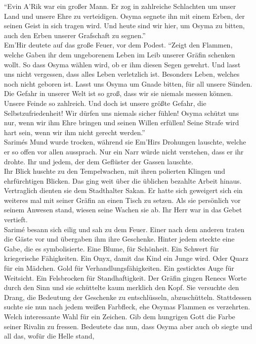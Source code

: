 ``Evin A'Rik war ein großer Mann. Er zog in zahlreiche Schlachten um unser Land und unsere Ehre 
zu verteidigen. Osyma segnete ihn mit einem Erben, der seinen Geist in sich tragen wird. Und heute 
sind wir hier, um Osyma zu bitten, auch den Erben unserer Grafschaft zu segnen.''\\
Em'Hir deutete auf das große Feuer, vor dem Podest. ``Zeigt den Flammen, welche Gaben ihr dem 
ungeborenem Leben im Leib unserer Gräfin schenken wollt. So dass Osyma wählen wird, ob er ihm 
diesen Segen gewehrt. Und lasst uns nicht vergessen, dass alles Leben verletzlich ist. Besonders 
Leben, welches noch nicht geboren ist. Lasst uns Osyma um Gnade bitten, für all unsere Sünden. 
Die Gefahr in unserer Welt ist so groß, dass wir sie niemals messen können. Unsere Feinde so 
zahlreich. Und doch ist unsere größte Gefahr, die Selbstzufriedenheit! Wir dürfen uns niemals 
sicher fühlen! Osyma schützt uns nur, wenn wir ihm Ehre bringen und seinen Willen erfüllen! 
Seine Strafe wird hart sein, wenn wir ihm nicht gerecht werden.''\\
Sarimés Mund wurde trocken, während sie Em'Hirs Drohungen lauschte, welche er so offen vor allen 
aussprach. Nur ein Narr würde nicht verstehen, dass er ihr drohte. Ihr und jedem, der dem 
Geflüster der Gassen lauschte. \\
Ihr Blick huschte zu den Tempelwachen, mit ihren polierten Klingen und ehrfürchtigen Blicken. Das 
ging weit über die üblichen bezahlte Arbeit hinaus. Vertraglich dienten sie dem Stadthalter 
Sakan. Er hatte sich geweigert sich ein weiteres mal mit seiner Gräfin an einen Tisch zu 
setzen. Als sie persönlich vor seinem Anwesen stand, wiesen seine Wachen sie ab. Ihr Herr war 
in das Gebet vertieft.\\
Sarimé besann sich eilig und sah zu dem Feuer. Einer nach dem anderen traten die Gäste vor und 
übergaben ihm ihre Geschenke. Hinter jedem steckte eine Gabe, die es symbolisierte. Eine Blume, für 
Schönheit. Ein Schwert für kriegerische Fähigkeiten. Ein Onyx, damit das Kind ein Junge wird. Oder 
Quarz für ein Mädchen. Gold für Verhandlungsfähigkeiten. Ein gesticktes Auge für Weitsicht. Ein 
Felsbrocken für Standhaftigkeit. Der Gräfin gingen Renecs Worte durch den Sinn und sie schüttelte 
kaum merklich den Kopf. Sie versuchte den Drang, die Bedeutung der Geschenke zu entschlüsseln, 
abzuschütteln. Stattdessen suchte sie nun nach jedem weißen Farbfleck, ehe Osymas Flammen es 
verzehrten. Welch interessante Wahl für ein Zeichen. Gib dem hungrigen Gott die Farbe seiner Rivalin 
zu fressen. Bedeutete das nun, dass Osyma aber auch ob siegte und all das, wofür die Helle stand, 
